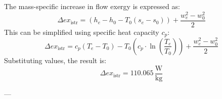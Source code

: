 The mass-specific increase in flow exergy is expressed as:  
\[
\Delta ex_{\text{istr}} = (h_e - h_0 - T_0 (s_e - s_0)) + \frac{w_e^2 - w_0^2}{2}
\]  
This can be simplified using specific heat capacity \( c_p \):  
\[
\Delta ex_{\text{istr}} = c_p (T_e - T_0) - T_0 \left( c_p \cdot \ln \left( \frac{T_e}{T_0} \right) \right) + \frac{w_e^2 - w_0^2}{2}
\]  
Substituting values, the result is:  
\[
\Delta ex_{\text{istr}} = 110.065 \, \frac{\text{W}}{\text{kg}}
\]  

---